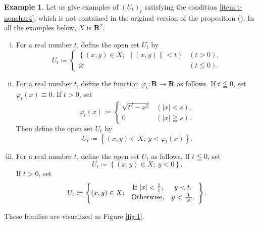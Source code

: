 ﻿\documentclass[a4paper,leqno]{jsarticle}
\theoremstyle{definition}
\newtheorem{Example+}[Axiom+]{Example}
\newcommand{\rr}{\mathbf{R}}
\numberwithin{equation}{section}
\theoremstyle{mystyle}
\begin{document}
\begin{Example+}
  Let us give examples of \(\left(U_{t}\right)_{t}\) 
  satisfying the condition \ref{item:t-nonchar4}, 
  which is not contained in the original version 
  of the proposition (\cite[Proposition 2.7.2]{KS90}). 
  In all the examples below, \(X\) is \(\rr^{2}\). 
  \begin{enumerate}[(i)]
    \item For a real number \(t\), 
    define the open set \(U_{t}\) by \[
      U_{t}\coloneqq
      \begin{cases}
      \left\{(x,y)\in X;\ \left\|(x,y)\right\|<t\right\}&(t>0),\\
      \varnothing&(t\leqq0).         
      \end{cases}
    \]
    \item For a real number \(t\), 
    define the function \(\varphi_{t}\colon \rr\to \rr\) as follows.
    If \(t\leqq 0\), set \(\varphi_{t}(x)\equiv 0\). 
    If \(t> 0\), set \[
      \varphi_{t}(x)\coloneqq\begin{cases}
        \sqrt{t^{2}-x^{2}} & (\left|x\right|<s),\\
        0&(\left|x\right|\geqq s).
      \end{cases}
    \]
    Then define the open set \(U_{t}\) by \[
      U_{t}\coloneqq
      \left\{(x,y)\in X;\ y<\varphi_{t}(x)\right\}. 
    \]
    \item For a real number \(t\), 
    define the open set \(U_{t}\) as follows. 
    If \(t\leqq0\), set \[
      U_{t}\coloneqq
      \left\{(x,y)\in X;\ y<0\right\}. 
    \]
    If \(t>0\), set \[
      U_{t}\coloneqq
      \left\{(x,y)\in X;\ 
        \begin{array}{cc}
          \text{If \(\left|x\right|<\tfrac{1}{t}\),}&y<t.\vspace{2pt}\\
          \text{Otherwise,}&y<\tfrac{1}{\left|x\right|}.
        \end{array}
      \right\}. 
    \]
  \end{enumerate}
  These families are visualized as Figure \ref{fig:1}.
\end{Example+}
\end{document}
